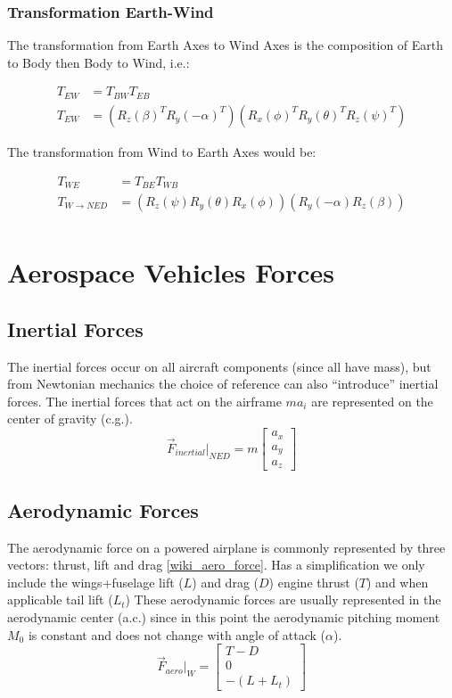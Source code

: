 \subsubsection{Transformation Earth-Wind}
The transformation from Earth Axes to Wind Axes is the composition of Earth to Body
then Body to Wind, i.e.:

\begin{align}
    T_{EW} &= T_{BW}T_{EB}\\
    T_{EW} &= (R_z(\beta)^T R_y(-\alpha)^T) (R_x(\phi)^T R_y(\theta)^T  R_z(\psi)^T)
\end{align}

The transformation from Wind to Earth Axes would be:

\begin{align}
    T_{WE} &= T_{BE}T_{WB}\\
    T_{W\rightarrow NED} &= (R_z(\psi) R_y(\theta) R_x(\phi)) (R_y(-\alpha) R_z(\beta)) \\
\end{align}


\newpage
\section{Aerospace Vehicles Forces}
\subsection{Inertial Forces}
The inertial forces occur on all aircraft components (since all have mass), but from Newtonian mechanics the choice of reference can also
``introduce'' inertial forces. The inertial forces that act on the airframe $m a_i$ are represented on the center of gravity (c.g.).
\begin{equation}
  \vec{F}_{inertial}|_{NED} = m
    \begin{bmatrix}
      a_x\\
      a_y\\
      a_z
    \end{bmatrix}
\end{equation}


\subsection{Aerodynamic Forces}
The aerodynamic force on a powered airplane is commonly represented by three vectors: thrust, lift and drag \ref{wiki_aero_force}.
Has a simplification we only include the wings+fuselage lift ($L$) and drag ($D$) engine thrust ($T$) and when applicable tail lift ($L_t$)
These aerodynamic forces are usually represented in the aerodynamic center (a.c.) since in this point the aerodynamic pitching moment $M_0$ is constant
and does not change with angle of attack ($\alpha$).
\begin{equation}
  \vec{F}_{aero}|_{W} =
    \begin{bmatrix}
      T-D\\
      0\\
      -(L+L_t)
    \end{bmatrix}
\end{equation}



